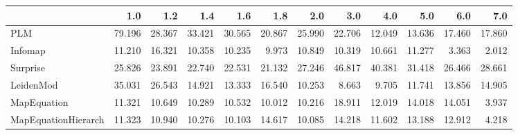 \begin{tabular}{lrrrrrrrrrrr}
\toprule
{} &    1.0 &    1.2 &    1.4 &    1.6 &    1.8 &    2.0 &    3.0 &    4.0 &    5.0 &    6.0 &    7.0 \\
\midrule
PLM                 & 79.196 & 28.367 & 33.421 & 30.565 & 20.867 & 25.990 & 22.706 & 12.049 & 13.636 & 17.460 & 17.860 \\
Infomap             & 11.210 & 16.321 & 10.358 & 10.235 &  9.973 & 10.849 & 10.319 & 10.661 & 11.277 &  3.363 &  2.012 \\
Surprise            & 25.826 & 23.891 & 22.740 & 22.531 & 21.132 & 27.246 & 46.817 & 40.381 & 31.418 & 26.466 & 28.661 \\
LeidenMod           & 35.031 & 26.543 & 14.921 & 13.333 & 16.540 & 10.253 &  8.663 &  9.705 & 11.741 & 13.856 & 14.905 \\
MapEquation         & 11.321 & 10.649 & 10.289 & 10.532 & 10.012 & 10.216 & 18.911 & 12.019 & 14.018 & 14.051 &  3.937 \\
MapEquationHierarch & 11.323 & 10.940 & 10.276 & 10.103 & 14.617 & 10.085 & 14.218 & 11.602 & 13.188 & 12.912 &  4.218 \\
\bottomrule
\end{tabular}
